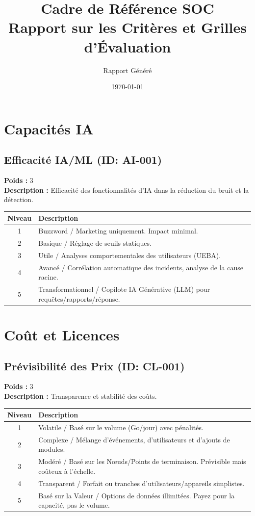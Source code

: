 \documentclass{article}
\title{Cadre de Référence SOC \\ Rapport sur les Critères et Grilles d'Évaluation}
\author{Rapport Généré}
\date{\today}
\begin{document}
\maketitle
\tableofcontents
\newpage

\section{Capacités IA}
\subsection{Efficacité IA/ML (ID: AI-001)}
\textbf{Poids :} 3 \\
\textbf{Description :} Efficacité des fonctionnalités d'IA dans la réduction du bruit et la détection.
\vspace{0.3cm}
\begin{longtable}{|c|p{12cm}|}
\hline
\rowcolor{lightgray} \textbf{Niveau} & \textbf{Description} \\ \hline
1 & Buzzword / Marketing uniquement. Impact minimal. \\ \hline
2 & Basique / Réglage de seuils statiques. \\ \hline
3 & Utile / Analyses comportementales des utilisateurs (UEBA). \\ \hline
4 & Avancé / Corrélation automatique des incidents, analyse de la cause racine. \\ \hline
5 & Transformationnel / Copilote IA Générative (LLM) pour requêtes/rapports/réponse. \\ \hline
\end{longtable}
\vspace{0.5cm}
\section{Coût et Licences}
\subsection{Prévisibilité des Prix (ID: CL-001)}
\textbf{Poids :} 3 \\
\textbf{Description :} Transparence et stabilité des coûts.
\vspace{0.3cm}
\begin{longtable}{|c|p{12cm}|}
\hline
\rowcolor{lightgray} \textbf{Niveau} & \textbf{Description} \\ \hline
1 & Volatile / Basé sur le volume (Go/jour) avec pénalités. \\ \hline
2 & Complexe / Mélange d'événements, d'utilisateurs et d'ajouts de modules. \\ \hline
3 & Modéré / Basé sur les Nœuds/Points de terminaison. Prévisible mais coûteux à l'échelle. \\ \hline
4 & Transparent / Forfait ou tranches d'utilisateurs/appareils simplistes. \\ \hline
5 & Basé sur la Valeur / Options de données illimitées. Payez pour la capacité, pas le volume. \\ \hline
\end{longtable}
\vspace{0.5cm}
\end{document}
